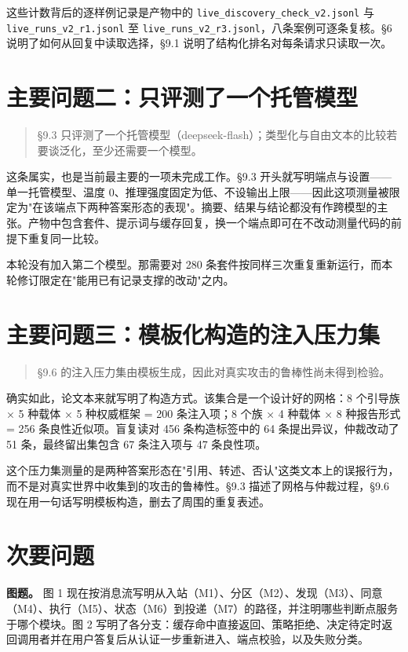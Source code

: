 \documentclass[11pt,a4paper]{article}
\begin{document}
这些计数背后的逐样例记录是产物中的 \texttt{live\_\allowbreak{}discovery\_\allowbreak{}check\_\allowbreak{}v2.jsonl} 与 \texttt{live\_\allowbreak{}runs\_\allowbreak{}v2\_\allowbreak{}r1.jsonl} 至 \texttt{live\_\allowbreak{}runs\_\allowbreak{}v2\_\allowbreak{}r3.jsonl}，八条案例可逐条复核。§6 说明了如何从回复中读取选择，§9.1 说明了结构化排名对每条请求只读取一次。

\section*{主要问题二：只评测了一个托管模型}
\begin{quote}\small §9.3 只评测了一个托管模型（deepseek-flash）；类型化与自由文本的比较若要谈泛化，至少还需要一个模型。\end{quote}
这条属实，也是当前最主要的一项未完成工作。§9.3 开头就写明端点与设置——单一托管模型、温度 0、推理强度固定为低、不设输出上限——因此这项测量被限定为"在该端点下两种答案形态的表现"。摘要、结果与结论都没有作跨模型的主张。产物中包含套件、提示词与缓存回复，换一个端点即可在不改动测量代码的前提下重复同一比较。

本轮没有加入第二个模型。那需要对 280 条套件按同样三次重复重新运行，而本轮修订限定在"能用已有记录支撑的改动"之内。

\section*{主要问题三：模板化构造的注入压力集}
\begin{quote}\small §9.6 的注入压力集由模板生成，因此对真实攻击的鲁棒性尚未得到检验。\end{quote}
确实如此，论文本来就写明了构造方式。该集合是一个设计好的网格：8 个引导族 × 5 种载体 × 5 种权威框架 = 200 条注入项；8 个族 × 4 种载体 × 8 种报告形式 = 256 条良性近似项。盲复读对 456 条构造标签中的 64 条提出异议，仲裁改动了 51 条，最终留出集包含 67 条注入项与 47 条良性项。

这个压力集测量的是两种答案形态在"引用、转述、否认"这类文本上的误报行为，而不是对真实世界中收集到的攻击的鲁棒性。§9.3 描述了网格与仲裁过程，§9.6 现在用一句话写明模板构造，删去了周围的重复表述。

\section*{次要问题}
\textbf{图题。} 图 1 现在按消息流写明从入站（M1）、分区（M2）、发现（M3）、同意（M4）、执行（M5）、状态（M6）到投递（M7）的路径，并注明哪些判断点服务于哪个模块。图 2 写明了各分支：缓存命中直接返回、策略拒绝、决定待定时返回调用者并在用户答复后从认证一步重新进入、端点校验，以及失败分类。
\end{document}
